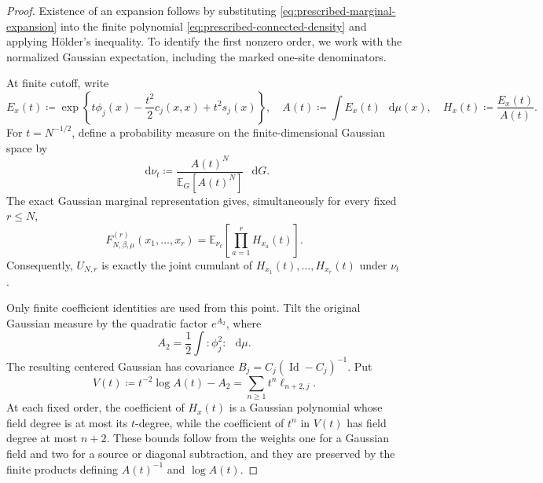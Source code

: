 \documentclass[11pt,reqno]{amsart}
\numberwithin{equation}{section}
\theoremstyle{plain}
\theoremstyle{definition}
\newcommand{\dd}{\mathop{}\!\mathrm d}
\newcommand{\E}{\mathbb E}
\newcommand{\Id}{\operatorname{Id}}
\newcommand{\be}{\beta}
\begin{document}
\begin{proof}
Existence of an expansion follows by substituting \eqref{eq:prescribed-marginal-expansion} into the finite polynomial \eqref{eq:prescribed-connected-density} and applying H\"older's inequality.  To identify the first nonzero order, we work with the normalized Gaussian expectation, including the marked one-site denominators.

At finite cutoff, write
\begin{equation}
 E_x(t)\coloneqq\exp\left\{t\phi_j(x)-\frac{t^2}{2}c_j(x,x)+t^2s_j(x)\right\},
 \quad
 A(t)\coloneqq\int E_x(t)\,\dd\mu(x),
 \quad
 H_x(t)\coloneqq\frac{E_x(t)}{A(t)}.
 \label{eq:prescribed-cluster-normalized-insertion}
\end{equation}
For $t=N^{-1/2}$, define a probability measure on the finite-dimensional Gaussian space by
\begin{equation}
 \dd\nu_t\coloneqq
 \frac{A(t)^N}{\E_G[A(t)^N]}\,\dd G.
 \label{eq:prescribed-cluster-Gaussian-tilt}
\end{equation}
The exact Gaussian marginal representation gives, simultaneously for every fixed $r\leq N$,
\begin{equation}
 F_{N,\be,\mu}^{(r)}(x_1,\ldots,x_r)
 =\E_{\nu_t}\left[\prod_{a=1}^rH_{x_a}(t)\right].
 \label{eq:prescribed-cluster-exact-moment}
\end{equation}
Consequently, $U_{N,r}$ is exactly the joint cumulant of $H_{x_1}(t),\ldots,H_{x_r}(t)$ under $\nu_t$.

Only finite coefficient identities are used from this point.  Tilt the original Gaussian measure by the quadratic factor $e^{A_2}$, where
\begin{equation}
 A_2=\frac12\int:\!\phi_j^2\!:\,\dd\mu.
 \label{eq:prescribed-cluster-quadratic-tilt}
\end{equation}
The resulting centered Gaussian has covariance $B_j=C_j(\Id-C_j)^{-1}$.  Put
\begin{equation}
 V(t)\coloneqq t^{-2}\log A(t)-A_2
 =\sum_{n\geq1}t^n\ell_{n+2,j}.
 \label{eq:prescribed-cluster-bulk-series}
\end{equation}
At each fixed order, the coefficient of $H_x(t)$ is a Gaussian polynomial whose field degree is at most its $t$-degree, while the coefficient of $t^n$ in $V(t)$ has field degree at most $n+2$.  These bounds follow from the weights one for a Gaussian field and two for a source or diagonal subtraction, and they are preserved by the finite products defining $A(t)^{-1}$ and $\log A(t)$.


\end{proof}
\end{document}

